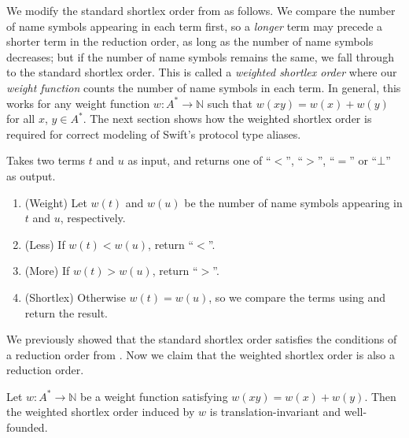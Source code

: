 \documentclass[../generics]{subfiles}
\begin{document}
We modify the standard shortlex order from  as follows. We compare the number of name symbols appearing in each term first, so a \emph{longer} term may precede a shorter term in the reduction order, as long as the number of name symbols decreases; but if the number of name symbols remains the same, we fall through to the standard shortlex order. This is called a \emph{weighted shortlex order} where our \emph{weight function} counts the number of name symbols in each term. In general, this works for any weight function $w\colon A^*\rightarrow\mathbb{N}$ such that $w(xy)=w(x)+w(y)$ for all $x$, $y\in A^*$. The next section shows how the weighted shortlex order is required for correct modeling of Swift's protocol type aliases.
\begin{algorithm}\label{rqm reduction order}
Takes two terms $t$ and $u$ as input, and returns one of ``$<$'', ``$>$'', ``$=$'' or \index{$\bot$}``$\bot$'' as output.
\begin{enumerate}
\item (Weight) Let $w(t)$ and $w(u)$ be the number of name symbols appearing in $t$ and $u$, respectively.
\item (Less) If $w(t)<w(u)$, return ``$<$''.
\item (More) If $w(t)>w(u)$, return ``$>$''.
\item (Shortlex) Otherwise $w(t)=w(u)$, so we compare the terms using  and return the result.
\end{enumerate}
\end{algorithm}
We previously showed that the standard shortlex order satisfies the conditions of a reduction order from . Now we claim that the weighted shortlex order is also a reduction order.
\begin{proposition} Let $w\colon A^*\rightarrow\mathbb{N}$ be a weight function satisfying $w(xy)=w(x)+w(y)$. Then the weighted shortlex order induced by $w$ is translation-invariant and well-founded.
\end{proposition}
\end{document}
